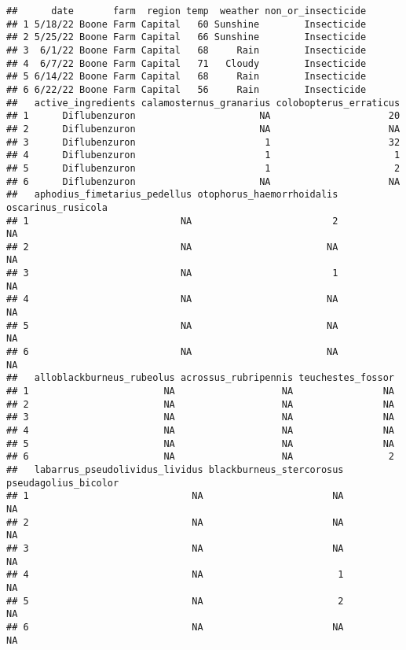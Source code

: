 \documentclass[
]{article}
\begin{document}
\begin{verbatim}
##      date       farm  region temp  weather non_or_insecticide
## 1 5/18/22 Boone Farm Capital   60 Sunshine        Insecticide
## 2 5/25/22 Boone Farm Capital   66 Sunshine        Insecticide
## 3  6/1/22 Boone Farm Capital   68     Rain        Insecticide
## 4  6/7/22 Boone Farm Capital   71   Cloudy        Insecticide
## 5 6/14/22 Boone Farm Capital   68     Rain        Insecticide
## 6 6/22/22 Boone Farm Capital   56     Rain        Insecticide
##   active_ingredients calamosternus_granarius colobopterus_erraticus
## 1      Diflubenzuron                      NA                     20
## 2      Diflubenzuron                      NA                     NA
## 3      Diflubenzuron                       1                     32
## 4      Diflubenzuron                       1                      1
## 5      Diflubenzuron                       1                      2
## 6      Diflubenzuron                      NA                     NA
##   aphodius_fimetarius_pedellus otophorus_haemorrhoidalis oscarinus_rusicola
## 1                           NA                         2                 NA
## 2                           NA                        NA                 NA
## 3                           NA                         1                 NA
## 4                           NA                        NA                 NA
## 5                           NA                        NA                 NA
## 6                           NA                        NA                 NA
##   alloblackburneus_rubeolus acrossus_rubripennis teuchestes_fossor
## 1                        NA                   NA                NA
## 2                        NA                   NA                NA
## 3                        NA                   NA                NA
## 4                        NA                   NA                NA
## 5                        NA                   NA                NA
## 6                        NA                   NA                 2
##   labarrus_pseudolividus_lividus blackburneus_stercorosus pseudagolius_bicolor
## 1                             NA                       NA                   NA
## 2                             NA                       NA                   NA
## 3                             NA                       NA                   NA
## 4                             NA                        1                   NA
## 5                             NA                        2                   NA
## 6                             NA                       NA                   NA

\end{verbatim}
\end{document}
